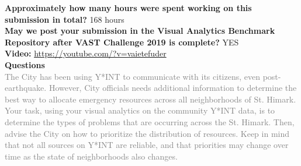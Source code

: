 \documentclass{article}
\begin{document}
\noindent
\textbf{Approximately how many hours were spent working on this submission in
total?} 168 hours \\

\noindent
\textbf{May we post your submission in the Visual Analytics Benchmark Repository
after VAST Challenge 2019 is complete?} YES \\

\noindent
\textbf{Video:} \url{https://youtube.com/?v=vaietefuder}\\

\noindent
\textbf{Questions} \\
\footnotesize{\textcolor{gray}{The City has been using Y*INT to communicate with
its citizens, even post-earthquake. However, City officials needs additional
information to determine the best way to allocate emergency resources across all
neighborhoods of St. Himark. Your task, using your visual analytics on the
community Y*INT data, is to determine the types of problems that are occurring
across the St.  Himark. Then, advise the City on how to prioritize the
distribution of resources. Keep in mind that not all sources on Y*INT are
reliable, and that priorities may change over time as the state of neighborhoods
also changes.}}
\end{document}
